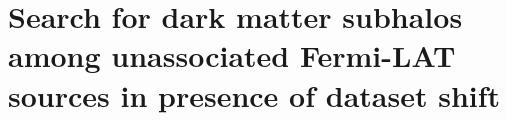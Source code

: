 ﻿%

\section{Search for dark matter subhalos among unassociated Fermi-LAT sources in presence of dataset shift}
\label{sec:dm_halos_paper}







\begin{subappendices}
	
	
	
\end{subappendices}
